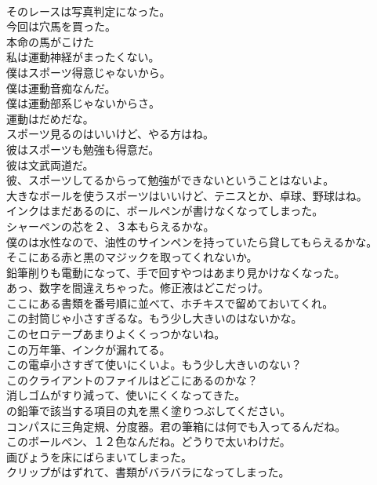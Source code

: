 \documentclass[8pt]{extreport}
\begin{document}
\begin{CJK}{UTF8}{min}
\\	そのレースは写真判定になった。	
\\	今回は穴馬を買った。	
\\	本命の馬がこけた	
\\	私は運動神経がまったくない。	
\\	僕はスポーツ得意じゃないから。	
\\	僕は運動音痴なんだ。	
\\	僕は運動部系じゃないからさ。	
\\	運動はだめだな。	
\\	スポーツ見るのはいいけど、やる方はね。	
\\	彼はスポーツも勉強も得意だ。	
\\	彼は文武両道だ。	
\\	彼、スポーツしてるからって勉強ができないということはないよ。	
\\	大きなボールを使うスポーツはいいけど、テニスとか、卓球、野球はね。	
\\	インクはまだあるのに、ボールペンが書けなくなってしまった。	
\\	シャーペンの芯を２、３本もらえるかな。	
\\	僕のは水性なので、油性のサインペンを持っていたら貸してもらえるかな。	
\\	そこにある赤と黒のマジックを取ってくれないか。	
\\	鉛筆削りも電動になって、手で回すやつはあまり見かけなくなった。	
\\	あっ、数字を間違えちゃった。修正液はどこだっけ。	
\\	ここにある書類を番号順に並べて、ホチキスで留めておいてくれ。	
\\	この封筒じゃ小さすぎるな。もう少し大きいのはないかな。	
\\	このセロテープあまりよくくっつかないね。	
\\	この万年筆、インクが漏れてる。	
\\	この電卓小さすぎて使いにくいよ。もう少し大きいのない？	
\\	このクライアントのファイルはどこにあるのかな？	
\\	消しゴムがすり減って、使いにくくなってきた。	
\\	の鉛筆で該当する項目の丸を黒く塗りつぶしてください。	
\\	コンパスに三角定規、分度器。君の筆箱には何でも入ってるんだね。	
\\	このボールペン、１２色なんだね。どうりで太いわけだ。	
\\	画びょうを床にばらまいてしまった。	
\\	クリップがはずれて、書類がバラバラになってしまった。	

\end{CJK}
\end{document}
